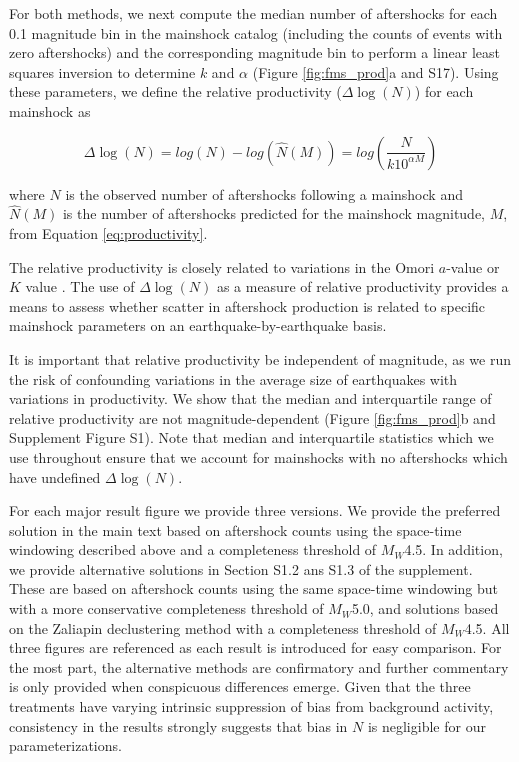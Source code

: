 \documentclass[draft, jgrga]{agujournal2018}
\begin{document}
For both methods, we next compute the median number of aftershocks for each 0.1 magnitude bin in the mainshock catalog (including the counts of events with zero aftershocks) and the corresponding magnitude bin to perform a linear least squares inversion to determine $k$ and $\alpha$ (Figure \ref{fig:fms_prod}a and S17). Using these parameters, we define the relative productivity ($\Delta \log(N)$) for each mainshock as
%
\begin{linenomath*}
\begin{equation}
    \Delta \log(N) = log(N) - log(\hat{N}(M)) = log\left(\dfrac{N}{k10^{\alpha M}}\right)
    \label{eq:residual_productivity}
\end{equation}
\end{linenomath*}
%
where $N$ is the observed number of aftershocks following a mainshock and $\hat{N}(M)$ is the number of aftershocks predicted for the mainshock magnitude, $M$, from Equation \ref{eq:productivity}.

The relative productivity is closely related to variations in the Omori $a$-value or $K$ value \citep[e.g.][]{Page, Hardebeck2018UpdatedParameters, Utsu1995,Ogata1988}. The use of $\Delta \log(N)$ as a measure of relative productivity provides a means to assess whether scatter in aftershock production is related to specific mainshock parameters on an earthquake-by-earthquake basis.

It is important that relative productivity be independent of magnitude, as we run the risk of confounding variations in the average size of earthquakes with variations in productivity. We show that the median and interquartile range of relative productivity are not magnitude-dependent (Figure \ref{fig:fms_prod}b and Supplement Figure S1). Note that median and interquartile statistics which we use throughout ensure that we account for mainshocks with no aftershocks which have undefined $\Delta \log(N)$.

For each major result figure we provide three versions. We provide the preferred solution in the main text based on aftershock counts using the space-time windowing described above and a completeness threshold of $M_W$4.5. In addition, we provide alternative solutions in Section S1.2 ans S1.3 of the supplement. These are based on aftershock counts using the same space-time windowing but with a more conservative completeness threshold of $M_W$5.0, and solutions based on the Zaliapin declustering method with a completeness threshold of $M_W$4.5. All three figures are referenced as each result is introduced for easy comparison. For the most part, the alternative methods are confirmatory and further commentary is only provided when conspicuous differences emerge. Given that the three treatments have varying intrinsic suppression of bias from background activity, consistency in the results strongly suggests that bias in $N$ is negligible for our parameterizations.
\end{document}
